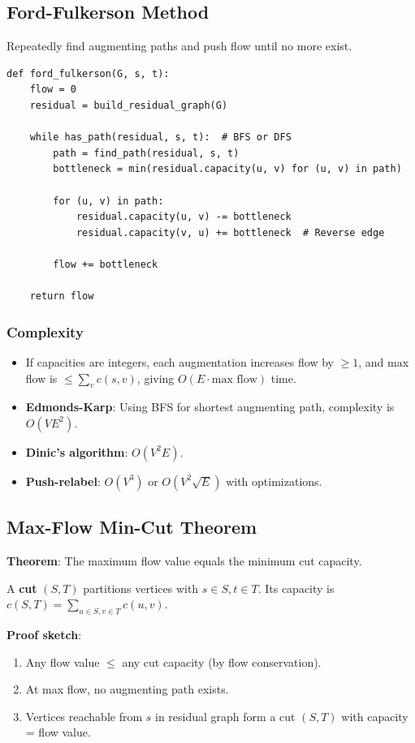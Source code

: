 \documentclass[11pt]{article}
\begin{document}
{{{\subsection*{Ford-Fulkerson Method}

Repeatedly find augmenting paths and push flow until no more exist.

\begin{lstlisting}
def ford_fulkerson(G, s, t):
    flow = 0
    residual = build_residual_graph(G)
    
    while has_path(residual, s, t):  # BFS or DFS
        path = find_path(residual, s, t)
        bottleneck = min(residual.capacity(u, v) for (u, v) in path)
        
        for (u, v) in path:
            residual.capacity(u, v) -= bottleneck
            residual.capacity(v, u) += bottleneck  # Reverse edge
        
        flow += bottleneck
    
    return flow
\end{lstlisting}

\subsubsection*{Complexity}
\begin{itemize}
\item If capacities are integers, each augmentation increases flow by $\ge 1$, and max flow is $\le \sum_v c(s,v)$, giving $O(E \cdot \text{max flow})$ time.
\item \textbf{Edmonds-Karp}: Using BFS for shortest augmenting path, complexity is $O(VE^2)$.
\item \textbf{Dinic's algorithm}: $O(V^2 E)$.
\item \textbf{Push-relabel}: $O(V^3)$ or $O(V^2 \sqrt{E})$ with optimizations.
\end{itemize}

\subsection*{Max-Flow Min-Cut Theorem}

\textbf{Theorem}: The maximum flow value equals the minimum cut capacity.

A \textbf{cut} $(S, T)$ partitions vertices with $s \in S, t \in T$. Its capacity is $c(S,T) = \sum_{u \in S, v \in T} c(u,v)$.

\textbf{Proof sketch}: 
\begin{enumerate}
\item Any flow value $\le$ any cut capacity (by flow conservation).
\item At max flow, no augmenting path exists.
\item Vertices reachable from $s$ in residual graph form a cut $(S, T)$ with capacity = flow value.
\end{enumerate}

}}}
\end{document}
